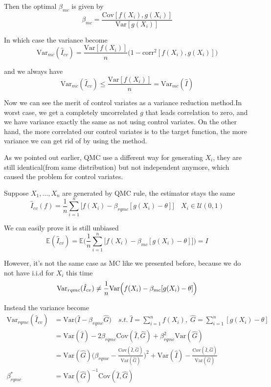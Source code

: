 Then the optimal $\beta_{mc}$ is given by 
\[
    \beta_{mc}=\frac{\mathrm{Cov}[f(X_i),g(X_i)]}{\mathrm{Var}[g(X_i)]}
\]

In which case the variance become
\[
    \mathrm{Var}_{mc}(\hat{I}_{cv})= \frac{\mathrm{Var}[f(X_i)]}{n}\big(1-\mathrm{corr}^2[f(X_i), g(X_i)]\big) 
\]

and we always have 
\[
\mathrm{Var}_{mc}(\hat{I}_{cv}) \leq \frac{\mathrm{Var}[f(X_i)]}{n}=\mathrm{Var}_{mc}(\hat{I})
\]

Now we can see the merit of control variates as a variance reduction method.In worst case, we get a completely uncorrelated $g$ that leads correlation to zero, and we have variance exactly the same as not using control variates. On the other hand, the more correlated our control variates is to the target function, the more variance we can get rid of by using the method.

As we pointed out earlier, QMC use a different way for generating $X_i$, they are still identical(from same distribution) but not independent anymore, which caused the problem for control variates.

Suppose $X_1, \dots, X_n$ are generated by QMC rule, the estimator stays the same
\[
    \hat{I}_{cv}(f)=\frac{1}{n}\sum_{i=1}^{n}\Big[ f(X_i)-\beta_{rqmc}[g(X_i)-\theta] \Big] \quad X_i\in \mathcal{U}(0,1)
\]

We can easily prove it is still unbiased
\[
\mathbb{E}(\hat{I}_{cv})=\mathbb{E}\Big(\frac{1}{n}\sum_{i=1}^{n}\Big[f(X_i)-\beta_{mc}[g(X_i)-\theta] \Big] \Big)=I 
\]

However, it's not the same case as MC like we presented before, because we do not have i.i.d for $X_i$ this time
\[
\mathrm{Var}_{rqmc}(\hat{I}_{cv}) \not=\frac{1}{n}\mathrm{Var}\Big(f(X_i)-\beta_{mc}[g(X_i)-\theta]\Big)\\
\]

Instead the variance become
\begin{align*}
\mathrm{Var}_{rqmc}(\hat{I}_{cv})  
&=\mathrm{Var}\Big( \hat{I}- \beta_{rqmc}\hat{G}\Big)
    \quad s.t.\; \hat{I}=\sum_{i=1}^{n}f(X_i),\; \hat{G}=\sum_{i=1}^{n}[g(X_i)-\theta]\\
&=\mathrm{Var}(\hat{I})-2\beta_{rqmc}\mathrm{Cov}(\hat{I},\hat{G})+\beta_{rqmc}^2\mathrm{Var}(\hat{G})\\
&=\mathrm{Var}(\hat{G})\Big(\beta_{rqmc}-\frac{\mathrm{Cov}(\hat{I},\hat{G})}{\mathrm{Var}(\hat{G})}\Big)^2+\mathrm{Var}(\hat{I})-\frac{\mathrm{Cov}(\hat{I},\hat{G})}{\mathrm{Var}(\hat{G})}\\
\beta_{rqmc}^*&= \mathrm{Var} (\hat{G})^{-1}\mathrm{Cov} (\hat{I}, \hat{G})
\end{align*}

